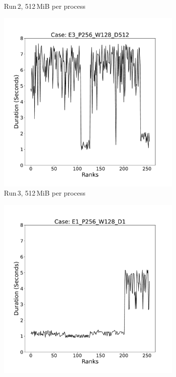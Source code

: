 \begin{figure}[h!]
\begin{subfigure}[b]{0.3\textwidth}
         \caption{Run\,2, 512\,MiB per process}
         \label{fig:E2_512}
     \end{subfigure}
      \hfill
     \begin{subfigure}[b]{0.3\textwidth}
         \centering
         \includegraphics[width=\textwidth, height=\textwidth]{figures/E3_P256_W128_D512.pdf}
         \caption{Run\,3, 512\,MiB per process}
         \label{fig:E3_512}
     \end{subfigure}
     \vfill
          \begin{subfigure}[b]{0.3\textwidth}
         \centering
         \includegraphics[width=\textwidth, height=\textwidth]{figures/E1_P256_W128_D1.pdf}

\end{subfigure}
\end{figure}
